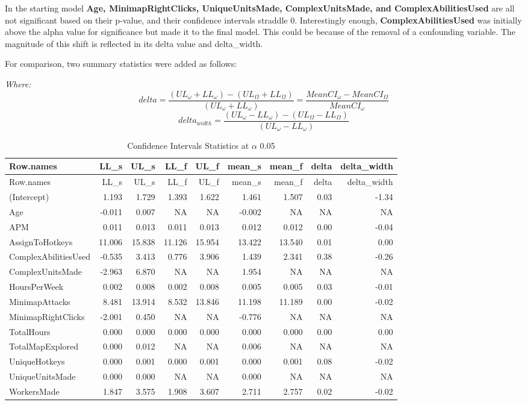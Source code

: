 \documentclass[]{article}
\begin{document}
In the starting model \textbf{Age, MinimapRightClicks, UniqueUnitsMade,
ComplexUnitsMade, and ComplexAbilitiesUsed} are all not significant
based on their p-value, and their confidence intervals straddle 0.
Interestingly enough, \textbf{ComplexAbilitiesUsed} was initially above
the alpha value for significance but made it to the final model. This
could be because of the removal of a confounding variable. The magnitude
of this shift is reflected in its delta value and delta\_width.

For comparison, two summary statistics were added as follows:

\emph{Where:}
\[delta=\frac{(UL_\omega+LL_\omega)-(UL_\Omega+LL_\Omega)}{(UL_\omega+LL_\omega)}=\frac{MeanCI_\omega-MeanCI_\Omega}{MeanCI_\omega}\]
\[delta_{width}=\frac{(UL_\omega-LL_\omega)-(UL_\Omega-LL_\Omega)}{(UL_\omega-LL_\omega)}\]

\begin{longtable}[]{@{}lrrrrrrrr@{}}
\caption{Confidence Intervals Statistics at \(\alpha\)
0.05}\tabularnewline
\toprule
Row.names & LL\_s & UL\_s & LL\_f & UL\_f & mean\_s & mean\_f & delta &
delta\_width\tabularnewline
\midrule
\endfirsthead
\toprule
Row.names & LL\_s & UL\_s & LL\_f & UL\_f & mean\_s & mean\_f & delta &
delta\_width\tabularnewline
\midrule
\endhead
(Intercept) & 1.193 & 1.729 & 1.393 & 1.622 & 1.461 & 1.507 & 0.03 &
-1.34\tabularnewline
Age & -0.011 & 0.007 & NA & NA & -0.002 & NA & NA & NA\tabularnewline
APM & 0.011 & 0.013 & 0.011 & 0.013 & 0.012 & 0.012 & 0.00 &
-0.04\tabularnewline
AssignToHotkeys & 11.006 & 15.838 & 11.126 & 15.954 & 13.422 & 13.540 &
0.01 & 0.00\tabularnewline
ComplexAbilitiesUsed & -0.535 & 3.413 & 0.776 & 3.906 & 1.439 & 2.341 &
0.38 & -0.26\tabularnewline
ComplexUnitsMade & -2.963 & 6.870 & NA & NA & 1.954 & NA & NA &
NA\tabularnewline
HoursPerWeek & 0.002 & 0.008 & 0.002 & 0.008 & 0.005 & 0.005 & 0.03 &
-0.01\tabularnewline
MinimapAttacks & 8.481 & 13.914 & 8.532 & 13.846 & 11.198 & 11.189 &
0.00 & -0.02\tabularnewline
MinimapRightClicks & -2.001 & 0.450 & NA & NA & -0.776 & NA & NA &
NA\tabularnewline
TotalHours & 0.000 & 0.000 & 0.000 & 0.000 & 0.000 & 0.000 & 0.00 &
0.00\tabularnewline
TotalMapExplored & 0.000 & 0.012 & NA & NA & 0.006 & NA & NA &
NA\tabularnewline
UniqueHotkeys & 0.000 & 0.001 & 0.000 & 0.001 & 0.000 & 0.001 & 0.08 &
-0.02\tabularnewline
UniqueUnitsMade & 0.000 & 0.000 & NA & NA & 0.000 & NA & NA &
NA\tabularnewline
WorkersMade & 1.847 & 3.575 & 1.908 & 3.607 & 2.711 & 2.757 & 0.02 &
-0.02\tabularnewline
\bottomrule
\end{longtable}
\end{document}
